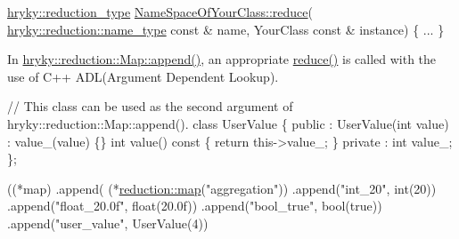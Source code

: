 \begin{DoxyCode}
  \hyperlink{classhryky_1_1_intrusive_ptr}{hryky::reduction_type} \hyperlink{namespacehryky_af41cb3af6766761da0ff21b84527a52c}{NameSpaceOfYourClass::reduce}(
    \hyperlink{classhryky_1_1reduction_1_1_string}{hryky::reduction::name_type} \textcolor{keyword}{const} & name, YourClass \textcolor{keyword}{const} & instance)
  \{
    ...
  \}
\end{DoxyCode}


In \hyperlink{classhryky_1_1reduction_1_1_map_a46fcabdd08327b7bdc4c72edb3623e7a}{hryky\-::reduction\-::\-Map\-::append()}, an appropriate \hyperlink{namespacehryky_af41cb3af6766761da0ff21b84527a52c}{reduce()} is called with the use of C++ A\-D\-L(\-Argument Dependent Lookup).




\begin{DoxyCodeInclude}
    \textcolor{comment}{// This class can be used as the second argument of
       hryky::reduction::Map::append().}
    \textcolor{keyword}{class }UserValue
    \{
    \textcolor{keyword}{public} :
        UserValue(\textcolor{keywordtype}{int} value) : value\_(value) \{\}
        \textcolor{keywordtype}{int} value()\textcolor{keyword}{ const }\{ \textcolor{keywordflow}{return} this->value\_; \}
    \textcolor{keyword}{private} :
        \textcolor{keywordtype}{int} value\_;
    \};

\end{DoxyCodeInclude}



\begin{DoxyCodeInclude}
    ((*map)
     .append(
         (*\hyperlink{namespacehryky_1_1reduction_ac5eae270cf8047b294dc4ff3e5e11a79}{reduction::map}(\textcolor{stringliteral}{"aggregation"}))
         .append(\textcolor{stringliteral}{"int\_20"},          \textcolor{keywordtype}{int}(20))
         .append(\textcolor{stringliteral}{"float\_20.0f"},     \textcolor{keywordtype}{float}(20.0f))
         .append(\textcolor{stringliteral}{"bool\_true"},       \textcolor{keywordtype}{bool}(\textcolor{keyword}{true}))
         .append(\textcolor{stringliteral}{"user\_value"},      UserValue(4))

\end{DoxyCodeInclude}



